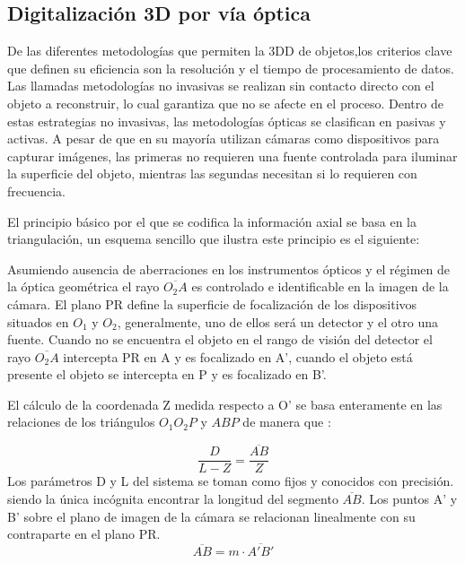 \documentclass[UTF8]{article}
\begin{document}
\subsection{Digitalización 3D por vía óptica}




%
De las diferentes metodologías que permiten la 3DD de objetos,los criterios clave que definen su eficiencia son la resolución y el tiempo de procesamiento de datos. Las llamadas metodologías no invasivas se realizan sin contacto directo con el objeto a reconstruir, lo cual garantiza que no se afecte en el proceso. Dentro de estas estrategias no invasivas, las metodologías ópticas se clasifican en pasivas y activas. A pesar de que en su mayoría utilizan cámaras como dispositivos para capturar imágenes, las primeras no requieren una fuente controlada para iluminar la superficie del objeto, mientras las segundas necesitan si lo requieren con frecuencia.
\medskip

El principio básico por el que se codifica la información axial se basa en la triangulación, un esquema sencillo que ilustra este principio es el siguiente:
\medskip

Asumiendo ausencia de aberraciones en los instrumentos ópticos y el régimen de la óptica geométrica el rayo $\overline{O_{2}A}$ es controlado e identificable en la imagen de la cámara. El plano PR define la superficie de focalización de los dispositivos situados en $O_{1}$ y $O_{2}$, generalmente, uno de ellos será un detector y el otro una fuente. Cuando no se encuentra el objeto en el rango de visión del detector el rayo  $\overline{O_{2}A}$ intercepta PR en A y es focalizado en A', cuando el objeto está presente el objeto se intercepta en P y es focalizado en B'.
\medskip

El cálculo de la coordenada Z medida respecto a O' se basa enteramente en las relaciones de los triángulos $O_{1}O_{2}P$ y $ABP$ de manera que : 
\medskip


\begin{equation}
\frac{D}{L-Z} = \frac{\overline{AB}}{Z}  
\end{equation}
%
Los parámetros D y L del sistema se toman como fijos y conocidos con precisión. siendo la única incógnita encontrar la longitud del segmento $\overline{AB}$. Los puntos A' y B' sobre el plano de imagen de la cámara se relacionan linealmente con su contraparte en el plano PR.
\begin{equation}
\overline{AB} = m\cdot\overline{A'B'}  
\end{equation}
\medskip
\end{document}
